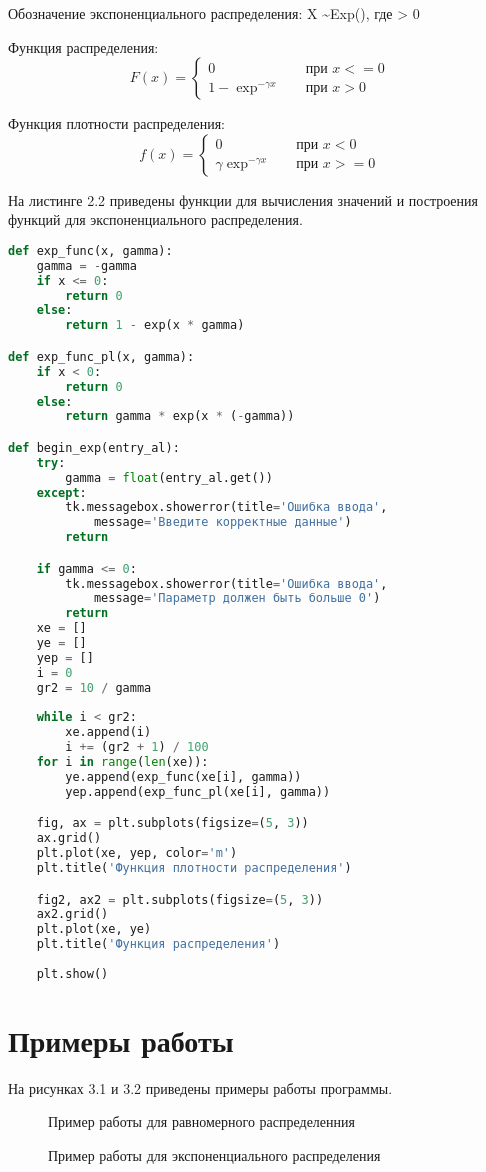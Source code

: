 \documentclass[12pt]{report}
\begin{document}
Обозначение экспоненциального распределения: X \sim Exp(\gamma), где \gamma > 0

Функция распределения:
\[ F(x) =
  \begin{cases}
    0       & \quad \text{при } x <= 0\\
    1 - \exp^{-\gamma x}  & \quad \text{при } x > 0
  \end{cases}
\]

Функция плотности распределения:
\[ f(x) =
  \begin{cases}
    0       & \quad \text{при } x < 0\\
    \gamma \exp^{-\gamma x}  & \quad \text{при } x >= 0
  \end{cases}
\]

На листинге 2.2 приведены функции для вычисления значений и построения функций для экспоненциального распределения.

\begin{lstlisting}[label=some-code,caption=Функии для экспоненциального распределения, language=Python]
def exp_func(x, gamma):
    gamma = -gamma
    if x <= 0:
        return 0
    else:
        return 1 - exp(x * gamma)

def exp_func_pl(x, gamma):
    if x < 0:
        return 0
    else:
        return gamma * exp(x * (-gamma))

def begin_exp(entry_al):
    try:
        gamma = float(entry_al.get())
    except:
        tk.messagebox.showerror(title='Ошибка ввода', 
            message='Введите корректные данные')
        return

    if gamma <= 0:
        tk.messagebox.showerror(title='Ошибка ввода', 
            message='Параметр должен быть больше 0')
        return
    xe = []
    ye = []
    yep = []
    i = 0
    gr2 = 10 / gamma
    
    while i < gr2:
        xe.append(i)
        i += (gr2 + 1) / 100
    for i in range(len(xe)):
        ye.append(exp_func(xe[i], gamma))
        yep.append(exp_func_pl(xe[i], gamma))

    fig, ax = plt.subplots(figsize=(5, 3))
    ax.grid()
    plt.plot(xe, yep, color='m')
    plt.title('Функция плотности распределения')

    fig2, ax2 = plt.subplots(figsize=(5, 3))
    ax2.grid()
    plt.plot(xe, ye)
    plt.title('Функция распределения')
    
    plt.show()
\end{lstlisting}
\chapter{Примеры работы}

На рисунках 3.1 и 3.2 приведены примеры работы программы.

\begin{figure}[ht!]	
		\caption{Пример работы для равномерного распределенния}
\end{figure}

\begin{figure}[ht!]	
		\caption{Пример работы для экспоненциального распределения}
\end{figure}
\end{document}
